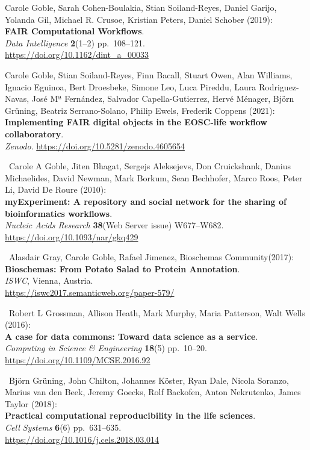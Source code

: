\begin{thebibliography}{9}
 Carole Goble, Sarah Cohen-Boulakia, Stian Soiland-Reyes, Daniel
Garijo, Yolanda Gil, Michael R. Crusoe, Kristian Peters, Daniel Schober
(2019):\\
\textbf{FAIR Computational Workflows}.\\
\emph{Data Intelligence} \textbf{2}(1--2) pp.~108--121.\\
\url{https://doi.org/10.1162/dint_a_00033}

 Carole Goble, Stian Soiland-Reyes, Finn Bacall, Stuart Owen,
Alan Williams, Ignacio Eguinoa, Bert Droesbeke, Simone Leo, Luca
Pireddu, Laura Rodriguez-Navas, José Mª Fernández, Salvador
Capella-Gutierrez, Hervé Ménager, Björn Grüning, Beatriz Serrano-Solano,
Philip Ewels, Frederik Coppens (2021):\\
\textbf{Implementing FAIR digital objects in the EOSC-life workflow
collaboratory}.\\
\emph{Zenodo}. \url{https://doi.org/10.5281/zenodo.4605654}

~Carole A Goble, Jiten Bhagat, Sergejs Aleksejevs, Don
Cruickshank, Danius Michaelides, David Newman, Mark Borkum, Sean
Bechhofer, Marco Roos, Peter Li, David De Roure (2010):\\
\textbf{myExperiment: A repository and social network for the sharing of
bioinformatics workflows}.\\
\emph{Nucleic Acids Research} \textbf{38}(Web Server issue)
W677--W682.\\
\url{https://doi.org/10.1093/nar/gkq429}

~Alasdair Gray, Carole Goble, Rafael Jimenez, Bioschemas
Community(2017):\\
\textbf{Bioschemas: From Potato Salad to Protein Annotation}.\\
\emph{ISWC}, Vienna, Austria.\\
\url{https://iswc2017.semanticweb.org/paper-579/}

~Robert L Grossman, Allison Heath, Mark Murphy, Maria Patterson,
Walt Wells (2016):\\
\textbf{A case for data commons: Toward data science as a service}.\\
\emph{Computing in Science \& Engineering} \textbf{18}(5) pp.~10--20.\\
\url{https://doi.org/10.1109/MCSE.2016.92}

~Björn Grüning, John Chilton, Johannes Köster, Ryan Dale, Nicola
Soranzo, Marius van den Beek, Jeremy Goecks, Rolf Backofen, Anton
Nekrutenko, James Taylor (2018):\\
\textbf{Practical computational reproducibility in the life sciences}.\\
\emph{Cell Systems} \textbf{6}(6) pp.~631--635.\\
\url{https://doi.org/10.1016/j.cels.2018.03.014}


\end{thebibliography}
